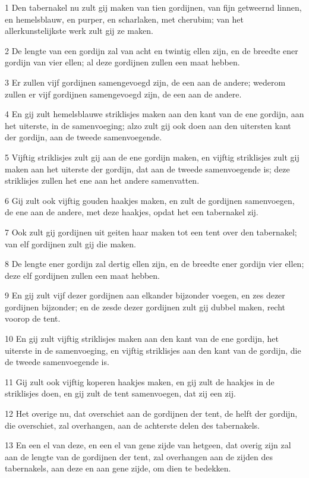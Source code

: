 \par 1 Den tabernakel nu zult gij maken van tien gordijnen, van fijn getweernd linnen, en hemelsblauw, en purper, en scharlaken, met cherubim; van het allerkunstelijkste werk zult gij ze maken.
\par 2 De lengte van een gordijn zal van acht en twintig ellen zijn, en de breedte ener gordijn van vier ellen; al deze gordijnen zullen een maat hebben.
\par 3 Er zullen vijf gordijnen samengevoegd zijn, de een aan de andere; wederom zullen er vijf gordijnen samengevoegd zijn, de een aan de andere.
\par 4 En gij zult hemelsblauwe striklisjes maken aan den kant van de ene gordijn, aan het uiterste, in de samenvoeging; alzo zult gij ook doen aan den uitersten kant der gordijn, aan de tweede samenvoegende.
\par 5 Vijftig striklisjes zult gij aan de ene gordijn maken, en vijftig striklisjes zult gij maken aan het uiterste der gordijn, dat aan de tweede samenvoegende is; deze striklisjes zullen het ene aan het andere samenvatten.
\par 6 Gij zult ook vijftig gouden haakjes maken, en zult de gordijnen samenvoegen, de ene aan de andere, met deze haakjes, opdat het een tabernakel zij.
\par 7 Ook zult gij gordijnen uit geiten haar maken tot een tent over den tabernakel; van elf gordijnen zult gij die maken.
\par 8 De lengte ener gordijn zal dertig ellen zijn, en de breedte ener gordijn vier ellen; deze elf gordijnen zullen een maat hebben.
\par 9 En gij zult vijf dezer gordijnen aan elkander bijzonder voegen, en zes dezer gordijnen bijzonder; en de zesde dezer gordijnen zult gij dubbel maken, recht voorop de tent.
\par 10 En gij zult vijftig striklisjes maken aan den kant van de ene gordijn, het uiterste in de samenvoeging, en vijftig striklisjes aan den kant van de gordijn, die de tweede samenvoegende is.
\par 11 Gij zult ook vijftig koperen haakjes maken, en gij zult de haakjes in de striklisjes doen, en gij zult de tent samenvoegen, dat zij een zij.
\par 12 Het overige nu, dat overschiet aan de gordijnen der tent, de helft der gordijn, die overschiet, zal overhangen, aan de achterste delen des tabernakels.
\par 13 En een el van deze, en een el van gene zijde van hetgeen, dat overig zijn zal aan de lengte van de gordijnen der tent, zal overhangen aan de zijden des tabernakels, aan deze en aan gene zijde, om dien te bedekken.
